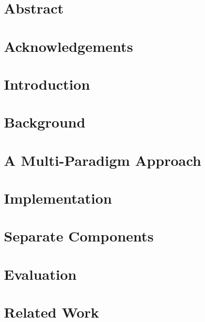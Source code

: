 \documentclass[11pt]{article}
\begin{document}

\clearpage

\onehalfspacing{}

\section*{Abstract}
\clearpage

\section*{Acknowledgements}
\label{sec:acknow}

\clearpage

\tableofcontents
\clearpage

\section{Introduction}
\label{sec:intro}


\clearpage
\section{Background}
\label{sec:background}


\clearpage
\section{A Multi-Paradigm Approach}
\label{sec:design}


\clearpage
\section{Implementation}
\label{sec:implementation}


\clearpage
\section{Separate Components}
\label{sec:separate-components}


\clearpage
\section{Evaluation}
\label{sec:evaluation}


\clearpage
\section{Related Work}
\label{sec:related-work}

\end{document}
